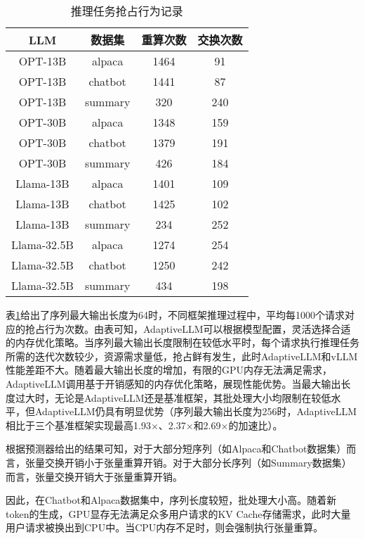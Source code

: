 \begin{table}[H]
  \centering
  \caption{推理任务抢占行为记录}
  \label{Table:推理任务抢占行为记录}
  \renewcommand{\arraystretch}{1.25}
  \small
  \begin{tabular}{c c c c}
    \toprule
    \textbf{LLM} & \textbf{数据集} & \textbf{重算次数} & \textbf{交换次数} \\
    \midrule
    OPT-13B & alpaca & 1464 & 91 \\
    OPT-13B & chatbot & 1441 & 87 \\
    OPT-13B & summary & 320 & 240 \\
    OPT-30B & alpaca & 1348 & 159 \\
    OPT-30B & chatbot & 1379 & 191 \\
    OPT-30B & summary & 426 & 184 \\
    Llama-13B & alpaca & 1401 & 109 \\
    Llama-13B & chatbot & 1425 & 102 \\
    Llama-13B & summary & 234 & 252 \\
    Llama-32.5B & alpaca & 1274 & 254 \\
    Llama-32.5B & chatbot & 1250 & 242 \\
    Llama-32.5B & summary & 434 & 198 \\
    \bottomrule
  \end{tabular}
\end{table}

表\ref{Table:推理任务抢占行为记录}给出了序列最大输出长度为64时，不同框架推理过程中，平均每1000个请求对应的抢占行为次数。由表可知，AdaptiveLLM可以根据模型配置，灵活选择合适的内存优化策略。当序列最大输出长度限制在较低水平时，每个请求执行推理任务所需的迭代次数较少，资源需求量低，抢占鲜有发生，此时AdaptiveLLM和vLLM性能差距不大。随着最大输出长度的增加，有限的GPU内存无法满足需求，AdaptiveLLM调用基于开销感知的内存优化策略，展现性能优势。当最大输出长度过大时，无论是AdaptiveLLM还是基准框架，其批处理大小均限制在较低水平，但AdaptiveLLM仍具有明显优势（序列最大输出长度为256时，AdaptiveLLM相比于三个基准框架实现最高1.93$\times$、2.37$\times$和2.69$\times$的加速比）。

根据预测器给出的结果可知，对于大部分短序列（如Alpaca和Chatbot数据集）而言，张量交换开销小于张量重算开销。对于大部分长序列（如Summary数据集）而言，张量交换开销大于张量重算开销。

因此，在Chatbot和Alpaca数据集中，序列长度较短，批处理大小高。随着新token的生成，GPU显存无法满足众多用户请求的KV Cache存储需求，此时大量用户请求被换出到CPU中。当CPU内存不足时，则会强制执行张量重算。

